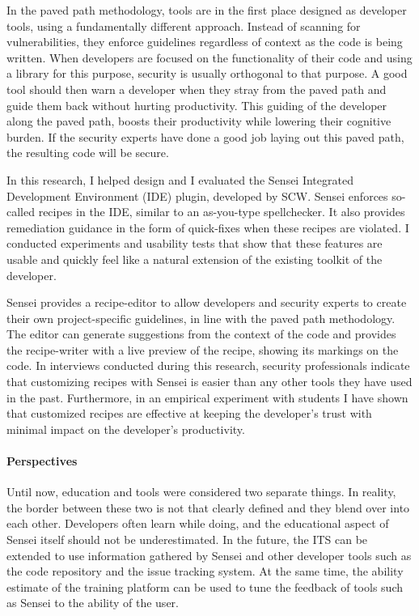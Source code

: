 In the paved path methodology, tools are in the first place designed as developer tools, using a fundamentally different approach.
Instead of scanning for vulnerabilities, they enforce guidelines regardless of context as the code is being written.
When developers are focused on the functionality of their code and using a library for this purpose, security is usually orthogonal to that purpose.
A good tool should then warn a developer when they stray from the paved path and guide them back without hurting productivity.
This guiding of the developer along the paved path, boosts their productivity while lowering their cognitive burden.
If the security experts have done a good job laying out this paved path, the resulting code will be secure.

In this research, I helped design and I evaluated the Sensei Integrated Development Environment (IDE) plugin, developed by SCW.
Sensei enforces so-called recipes in the IDE, similar to an as-you-type spellchecker.
It also provides remediation guidance in the form of quick-fixes when these recipes are violated.
I conducted experiments and usability tests that show that these features are usable and quickly feel like a natural extension of the existing toolkit of the developer.

Sensei provides a recipe-editor to allow developers and security experts to create their own project-specific guidelines, in line with the paved path methodology.
The editor can generate suggestions from the context of the code and provides the recipe-writer with a live preview of the recipe, showing its markings on the code.
In interviews conducted during this research, security professionals indicate that customizing recipes with Sensei is easier than any other tools they have used in the past.
Furthermore, in an empirical experiment with students I have shown that customized recipes are effective at keeping the developer's trust with minimal impact on the developer's productivity.

\paragraph{Perspectives}
Until now, education and tools were considered two separate things.
In reality, the border between these two is not that clearly defined and they blend over into each other.
Developers often learn while doing, and the educational aspect of Sensei itself should not be underestimated.
In the future, the ITS can be extended to use information gathered by Sensei and other developer tools such as the code repository and the issue tracking system.
At the same time, the ability estimate of the training platform can be used to tune the feedback of tools such as Sensei to the ability of the user.